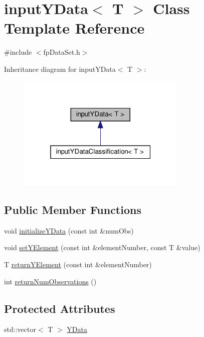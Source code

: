 \hypertarget{classinputYData}{}\section{input\+Y\+Data$<$ T $>$ Class Template Reference}
\label{classinputYData}


{\ttfamily \#include $<$fp\+Data\+Set.\+h$>$}



Inheritance diagram for input\+Y\+Data$<$ T $>$\+:\nopagebreak
\begin{figure}[H]
\begin{center}
\leavevmode
\includegraphics[width=229pt]{classinputYData__inherit__graph}
\end{center}
\end{figure}
\subsection*{Public Member Functions}
\begin{DoxyCompactItemize}
\item 
void \hyperlink{classinputYData_abe1f8827e0bc89cec0c218ed5cfeea72}{initialize\+Y\+Data} (const int \&num\+Obs)
\item 
void \hyperlink{classinputYData_a61b9bdd63af5bc6aa071185a5cf1c093}{set\+Y\+Element} (const int \&element\+Number, const T \&value)
\item 
T \hyperlink{classinputYData_affffd6432eaa11acc46fc83fb4ce409a}{return\+Y\+Element} (const int \&element\+Number)
\item 
int \hyperlink{classinputYData_a93becb50dcb3b2d6dd3c488ae83b2c6b}{return\+Num\+Observations} ()
\end{DoxyCompactItemize}
\subsection*{Protected Attributes}
\begin{DoxyCompactItemize}
\item 
std\+::vector$<$ T $>$ \hyperlink{classinputYData_a0b1d0b2e92ec4351f8a098a365fd9746}{Y\+Data}
\end{DoxyCompactItemize}


